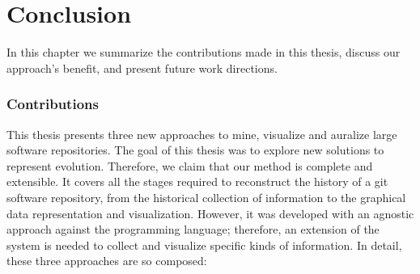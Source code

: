 \chapter{Conclusion}
In this chapter we summarize the contributions made in this thesis, discuss our approach's benefit, and present future work directions.

\subsection*{Contributions}
This thesis presents three new approaches to mine, visualize and auralize large software repositories. The goal of this thesis was to explore new solutions to represent evolution. Therefore, we claim that our method is complete and extensible. It covers all the stages required to reconstruct the history of a git software repository, from the historical collection of information to the graphical data representation and visualization. However, it was developed with an agnostic approach against the programming language; therefore, an extension of the system is needed to collect and visualize specific kinds of information. In detail, these three approaches are so composed:
